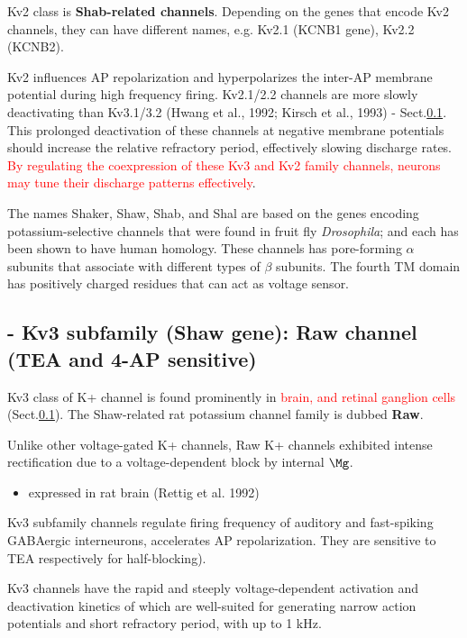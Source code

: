 Kv2 class is {\bf Shab-related channels}. Depending  on the genes that encode
Kv2 channels, they can have different names, e.g. Kv2.1 (KCNB1 gene), Kv2.2
(KCNB2).
   
Kv2 influences AP repolarization and hyperpolarizes the inter-AP membrane
potential during high frequency firing.
Kv2.1/2.2 channels are more slowly deactivating than Kv3.1/3.2 (Hwang et al.,
1992; Kirsch et al., 1993) - Sect.\ref{sec:Kv3-channels}.
This prolonged deactivation of these channels at negative membrane potentials
should increase the relative refractory period, effectively slowing discharge
rates. \textcolor{red}{By regulating the coexpression of these Kv3 and Kv2
family channels, neurons may tune their discharge patterns effectively}.

\begin{mdframed}
The names Shaker, Shaw, Shab, and Shal are  based on the genes encoding
potassium-selective channels that were found in fruit fly {\it Drosophila}; and
each has been shown to have human homology.
These channels has pore-forming $\alpha$ subunits that associate with different
types of $\beta$ subunits. The fourth TM  domain has positively charged
residues that can act as voltage sensor.

\end{mdframed}

\subsection{- Kv3 subfamily (Shaw gene): Raw channel (TEA and 4-AP sensitive)}
\label{sec:Kv3-channels}
\label{sec:Shaw-gene}
\label{sec:Raw-K+-channel}

Kv3 class of K+ channel is found prominently in \textcolor{red}{brain, and
retinal ganglion cells} (Sect.\ref{sec:Kv3-channels}). The Shaw-related rat
potassium channel family is dubbed {\bf Raw}.

Unlike other voltage-gated K+ channels, Raw K+ channels exhibited intense
rectification due to a voltage-dependent block by internal $\Mg$.
\begin{itemize}
  \item expressed in rat brain (Rettig et al. 1992) 
\end{itemize}

Kv3 subfamily channels regulate firing frequency of auditory and fast-spiking
GABAergic interneurons, accelerates AP repolarization. They are sensitive to TEA
respectively for half-blocking).

Kv3 channels have the rapid and steeply voltage-dependent activation and
deactivation kinetics of which are well-suited for generating narrow action
potentials and short refractory period, with up to 1 kHz.

